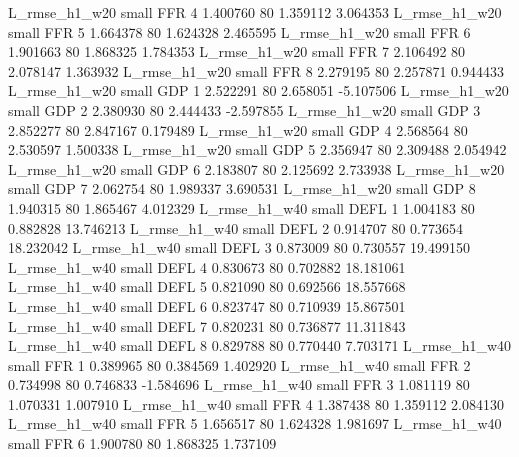  L_rmse_h1_w20      small      FFR                 4 1.400760 80       1.359112           3.064353
 L_rmse_h1_w20      small      FFR                 5 1.664378 80       1.624328           2.465595
 L_rmse_h1_w20      small      FFR                 6 1.901663 80       1.868325           1.784353
 L_rmse_h1_w20      small      FFR                 7 2.106492 80       2.078147           1.363932
 L_rmse_h1_w20      small      FFR                 8 2.279195 80       2.257871           0.944433
 L_rmse_h1_w20      small      GDP                 1 2.522291 80       2.658051          -5.107506
 L_rmse_h1_w20      small      GDP                 2 2.380930 80       2.444433          -2.597855
 L_rmse_h1_w20      small      GDP                 3 2.852277 80       2.847167           0.179489
 L_rmse_h1_w20      small      GDP                 4 2.568564 80       2.530597           1.500338
 L_rmse_h1_w20      small      GDP                 5 2.356947 80       2.309488           2.054942
 L_rmse_h1_w20      small      GDP                 6 2.183807 80       2.125692           2.733938
 L_rmse_h1_w20      small      GDP                 7 2.062754 80       1.989337           3.690531
 L_rmse_h1_w20      small      GDP                 8 1.940315 80       1.865467           4.012329
 L_rmse_h1_w40      small     DEFL                 1 1.004183 80       0.882828          13.746213
 L_rmse_h1_w40      small     DEFL                 2 0.914707 80       0.773654          18.232042
 L_rmse_h1_w40      small     DEFL                 3 0.873009 80       0.730557          19.499150
 L_rmse_h1_w40      small     DEFL                 4 0.830673 80       0.702882          18.181061
 L_rmse_h1_w40      small     DEFL                 5 0.821090 80       0.692566          18.557668
 L_rmse_h1_w40      small     DEFL                 6 0.823747 80       0.710939          15.867501
 L_rmse_h1_w40      small     DEFL                 7 0.820231 80       0.736877          11.311843
 L_rmse_h1_w40      small     DEFL                 8 0.829788 80       0.770440           7.703171
 L_rmse_h1_w40      small      FFR                 1 0.389965 80       0.384569           1.402920
 L_rmse_h1_w40      small      FFR                 2 0.734998 80       0.746833          -1.584696
 L_rmse_h1_w40      small      FFR                 3 1.081119 80       1.070331           1.007910
 L_rmse_h1_w40      small      FFR                 4 1.387438 80       1.359112           2.084130
 L_rmse_h1_w40      small      FFR                 5 1.656517 80       1.624328           1.981697
 L_rmse_h1_w40      small      FFR                 6 1.900780 80       1.868325           1.737109

